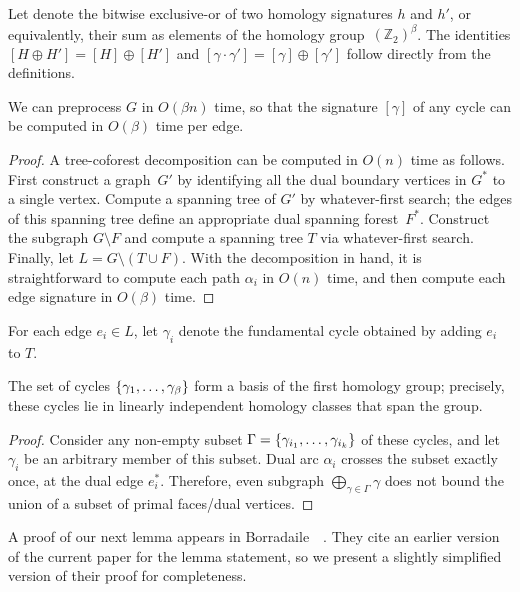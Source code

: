 \documentclass[letterpaper,review]{siamart190516}
\def\Z{\mathbb{Z}}
\def\cycle{\gamma}
\def\dualarc{\alpha}
\begin{document}
Let  denote the bitwise exclusive-or of two homology signatures $h$ and $h'$, or equivalently, their sum as elements of the homology group~$(\Z_2)^\beta$.  The identities $[H \oplus H'] = [H] \oplus [H']$ and $[\cycle\cdot\cycle'] = [\cycle] \oplus [\cycle']$ follow directly from the definitions.

\begin{lemma}
\label{lem:sign}
We can preprocess $G$ in $O(\beta n)$ time, so that the signature $[\cycle]$ of any cycle can be computed in $O(\beta)$ time per edge.
\end{lemma}

\begin{proof}
A tree-coforest decomposition can be computed in $O(n)$ time as follows.  First construct a graph~$G'$ by identifying all the dual boundary vertices in $G^*$ to a single vertex.  Compute a spanning tree of $G'$ by whatever-first search; the edges of this spanning tree define an appropriate dual spanning forest~$F^*$.  Construct the subgraph $G\setminus F$ and compute a spanning tree $T$ via whatever-first search.  Finally, let $L = G\setminus (T\cup F)$.  With the decomposition in hand, it is straightforward to compute each path $\dualarc_i$ in $O(n)$ time, and then compute each edge signature in $O(\beta)$ time.
\end{proof}

For each edge \(e_i \in L\), let \(\cycle_i\) denote the fundamental cycle obtained by adding
\(e_i\) to \(T\).
\begin{lemma}
\label{lem:basis}
The set of cycles \(\Set{\cycle_1, \dots, \cycle_\beta}\) form a basis of the first homology group;
precisely, these cycles lie in linearly independent homology classes that span the group.
\end{lemma}
\begin{proof}
  Consider any non-empty subset \(\Gamma = \Set{\cycle_{i_1}, \dots, \cycle_{i_k}}\) of these
  cycles, and let \(\cycle_i\) be an arbitrary member of this subset.
  Dual arc \(\alpha_i\) crosses the subset exactly once, at the dual edge \(e^*_i\).
  Therefore, even subgraph \(\bigoplus_{\cycle \in \Gamma} \cycle\) does not bound the union of a
  subset of primal faces/dual vertices.
\end{proof}

A proof of our next lemma appears in Borradaile~\etal~\cite[Corollary 3.5]{bcfn-mchbs-17}.
They cite an earlier version~\cite{en-mcsnc-11} of the current paper for the lemma statement, so we
present a slightly simplified version of their proof for completeness.
\end{document}
